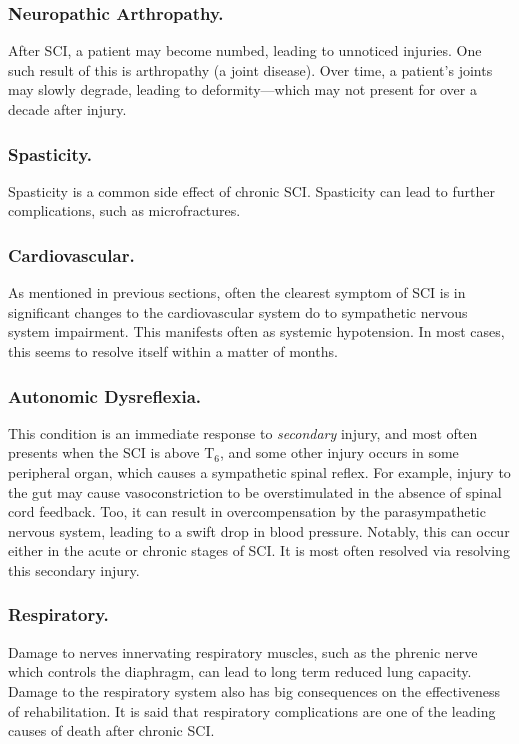 \subsubsection{Neuropathic Arthropathy.}
After SCI, a patient may become numbed, leading to unnoticed injuries. One such result of this is arthropathy (a joint disease). Over time, a patient's joints may slowly degrade, leading to deformity---which may not present for over a decade after injury. 

\subsubsection{Spasticity.}
Spasticity is a common side effect of chronic SCI. Spasticity can lead to further complications, such as microfractures. 

\subsubsection{Cardiovascular.}
As mentioned in previous sections, often the clearest symptom of SCI is in significant changes to the cardiovascular system do to sympathetic nervous system impairment. This manifests often as systemic hypotension. In most cases, this seems to resolve itself within a matter of months. 

\subsubsection{Autonomic Dysreflexia.}
This condition is an immediate response to \textit{secondary} injury, and most often presents when the SCI is above T$_6$, and some other injury occurs in some peripheral organ, which causes a sympathetic spinal reflex. For example, injury to the gut may cause vasoconstriction to be overstimulated in the absence of spinal cord feedback. Too, it can result in overcompensation by the parasympathetic nervous system, leading to a swift drop in blood pressure. Notably, this can occur either in the acute or chronic stages of SCI. It is most often resolved via resolving this secondary injury. 

\subsubsection{Respiratory.}
Damage to nerves innervating respiratory muscles, such as the phrenic nerve which controls the diaphragm, can lead to long term reduced lung capacity. Damage to the respiratory system also has big consequences on the effectiveness of rehabilitation. It is said that respiratory complications are one of the leading causes of death after chronic SCI.

